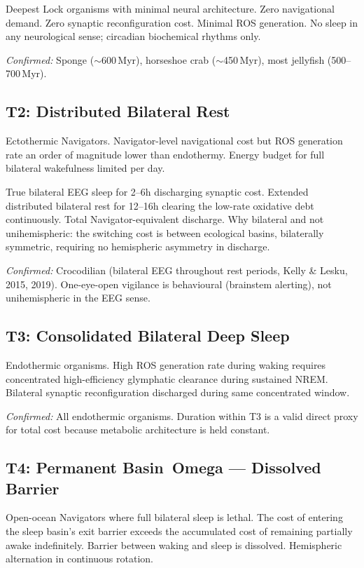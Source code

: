 \documentclass[10pt, a4paper]{article}
\begin{document}
Deepest Lock organisms with minimal
neural architecture. Zero navigational
demand. Zero synaptic reconfiguration
cost. Minimal ROS generation. No sleep
in any neurological sense; circadian
biochemical rhythms only.

\textit{Confirmed:} Sponge ($\sim$600\,Myr),
horseshoe crab ($\sim$450\,Myr), most
jellyfish (500--700\,Myr).

\subsection{T2: Distributed Bilateral
Rest}

Ectothermic Navigators. Navigator-level
navigational cost but ROS generation
rate an order of magnitude lower than
endothermy. Energy budget for full
bilateral wakefulness limited per day.

True bilateral EEG sleep for 2--6h
discharging synaptic cost. Extended
distributed bilateral rest for 12--16h
clearing the low-rate oxidative debt
continuously. Total Navigator-equivalent
discharge. Why bilateral and not
unihemispheric: the switching cost is
between ecological basins, bilaterally
symmetric, requiring no hemispheric
asymmetry in discharge.

\textit{Confirmed:} Crocodilian
(bilateral EEG throughout rest periods,
Kelly \& Lesku, 2015, 2019). One-eye-open
vigilance is behavioural (brainstem
alerting), not unihemispheric in the
EEG sense.

\subsection{T3: Consolidated Bilateral
Deep Sleep}

Endothermic organisms. High ROS
generation rate during waking requires
concentrated high-efficiency glymphatic
clearance during sustained NREM.
Bilateral synaptic reconfiguration
discharged during same concentrated
window.

\textit{Confirmed:} All endothermic
organisms. Duration within T3 is a
valid direct proxy for total cost
because metabolic architecture is
held constant.

\subsection{T4: Permanent Basin~Omega ---
Dissolved Barrier}

Open-ocean Navigators where full
bilateral sleep is lethal. The cost
of entering the sleep basin's exit
barrier exceeds the accumulated cost
of remaining partially awake
indefinitely. Barrier between waking
and sleep is dissolved. Hemispheric
alternation in continuous rotation.
\end{document}
